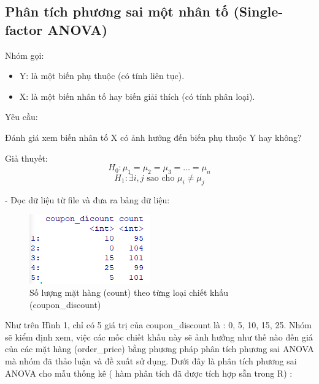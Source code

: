 \subsection{Phân tích phương sai một nhân tố (Single-factor ANOVA)}


Nhóm gọi:
\begin{itemize}
    \item Y: là một biến phụ thuộc (có tính liên tục).
    \item X: là một biến nhân tố hay biến giải thích (có tính phân loại).
\end{itemize}

Yêu cầu:
\begin{itemize}
    Đánh giá xem biến nhân tố X có ảnh hưởng đến biến phụ thuộc Y hay không?
\end{itemize}
Giả thuyết:
  \[
  H_{0}: \mu_{1} = \mu_{2} = \mu_{3} = \dots = \mu_{n}
  \]
  \[
  H_{1}: \exists i, j \text{ sao cho } \mu_{i} \neq \mu_{j}
  \]

- Đọc dữ liệu từ file và đưa ra bảng dữ liệu:


\begin{figure}[!htbp]
    \centering
    \includegraphics[width=0.4\linewidth]{graphics/5.3.1.png}
    \caption{Số lượng mặt hàng (count) theo từng loại chiết khấu (coupon\_discount)}
\end{figure}

Như trên Hình 1, chỉ có 5 giá trị của coupon_discount là : 0, 5, 10, 15, 25. Nhóm sẽ kiểm định xem, việc các mốc chiết khấu này sẽ ảnh hưởng như thế nào đến giá của các mặt hàng (order_price) bằng phương pháp phân tích phương sai ANOVA mà nhóm đã thảo luận và đề xuất sử dụng. Dưới đây là phân tích phương sai ANOVA cho mẫu thống kê ( hàm phân tích đã được tích hợp sẵn trong R) :
